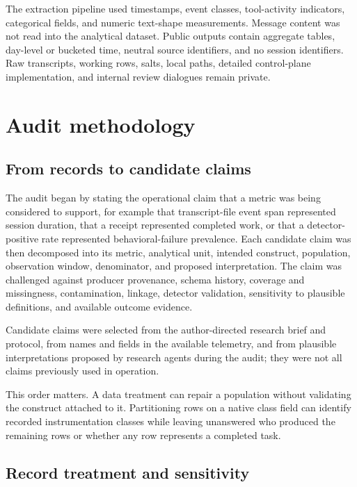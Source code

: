 \documentclass[12pt]{article}
\begin{document}
The extraction pipeline used timestamps, event classes, tool-activity indicators, categorical fields, and numeric text-shape measurements. Message content was not read into the analytical dataset. Public outputs contain aggregate tables, day-level or bucketed time, neutral source identifiers, and no session identifiers. Raw transcripts, working rows, salts, local paths, detailed control-plane implementation, and internal review dialogues remain private.

\section{Audit methodology}\label{audit-methodology}

\subsection{From records to candidate claims}\label{from-records-to-candidate-claims}

The audit began by stating the operational claim that a metric was being considered to support, for example that transcript-file event span represented session duration, that a receipt represented completed work, or that a detector-positive rate represented behavioral-failure prevalence. Each candidate claim was then decomposed into its metric, analytical unit, intended construct, population, observation window, denominator, and proposed interpretation. The claim was challenged against producer provenance, schema history, coverage and missingness, contamination, linkage, detector validation, sensitivity to plausible definitions, and available outcome evidence.

Candidate claims were selected from the author-directed research brief and protocol, from names and fields in the available telemetry, and from plausible interpretations proposed by research agents during the audit; they were not all claims previously used in operation.

This order matters. A data treatment can repair a population without validating the construct attached to it. Partitioning rows on a native class field can identify recorded instrumentation classes while leaving unanswered who produced the remaining rows or whether any row represents a completed task.

\subsection{Record treatment and sensitivity}\label{record-treatment-and-sensitivity}
\end{document}
